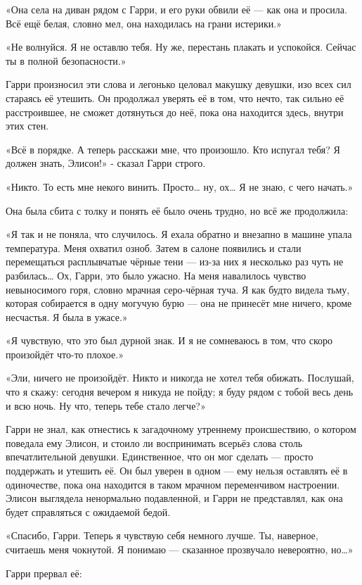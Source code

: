 \documentclass[a5paper, 9pt,
final, openany, twoside=true]{memoir}
\begin{document}
«Она села на диван рядом с Гарри, и его руки обвили её — как она и просила. Всё ещё белая, словно мел, она находилась на грани истерики.»

«Не волнуйся. Я не оставлю тебя. Ну же, перестань плакать и успокойся. Сейчас ты в полной безопасности.»

Гарри произносил эти слова и легонько целовал макушку девушки, изо всех сил стараясь её утешить. Он продолжал уверять её в том, что нечто, так сильно её расстроившее, не сможет дотянуться до неё, пока она находится здесь, внутри этих стен.

«Всё в порядке. А теперь расскажи мне, что произошло. Кто испугал тебя? Я должен знать, Элисон!» - сказал Гарри строго.

«Никто. То есть мне некого винить. Просто… ну, ох… Я не знаю, с чего начать.»

Она была сбита с толку и понять её было очень трудно, но всё же продолжила:

«Я так и не поняла, что случилось. Я ехала обратно и внезапно в машине упала температура. Меня охватил озноб. Затем в салоне появились и стали перемещаться расплывчатые чёрные тени — из-за них я несколько раз чуть не разбилась… Ох, Гарри, это было ужасно. На меня навалилось чувство невыносимого горя, словно мрачная серо-чёрная туча. Я как будто видела тьму, которая собирается в одну могучую бурю — она не принесёт мне ничего, кроме несчастья. Я была в ужасе.»

«Я чувствую, что это был дурной знак. И я не сомневаюсь в том, что скоро произойдёт что-то плохое.»

«Эли, ничего не произойдёт. Никто и никогда не хотел тебя обижать. Послушай, что я скажу: сегодня вечером я никуда не пойду; я буду рядом с тобой весь день и всю ночь. Ну что, теперь тебе стало легче?»\bigskip

Гарри не знал, как отнестись к загадочному утреннему происшествию, о котором поведала ему Элисон, и стоило ли воспринимать всерьёз слова столь впечатлительной девушки. Единственное, что он мог сделать — просто поддержать и утешить её. Он был уверен в одном — ему нельзя оставлять её в одиночестве, пока она находится в таком мрачном переменчивом настроении. Элисон выглядела ненормально подавленной, и Гарри не представлял, как она будет справляться с ожидаемой бедой.

«Спасибо, Гарри. Теперь я чувствую себя немного лучше. Ты, наверное, считаешь меня чокнутой. Я понимаю — сказанное прозвучало невероятно, но…»

Гарри прервал её:
\end{document}
